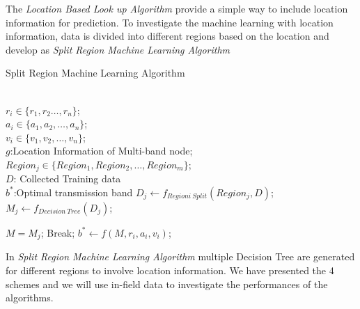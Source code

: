 The \emph{Location Based Look up Algorithm} provide a simple way to include location information for prediction. To investigate the machine learning with location information, data is divided into different regions based on the location and develop as \emph{Split Region Machine Learning Algorithm}


	  \begin{algorithm}
	  \caption{Split Region Machine Learning Algorithm}
	  \label{algorithms: Split}
	  \begin{algorithmic}[1]
	  \REQUIRE  ~~\\
		  $r_i \in \{r_1,r_2 \dots,r_n\}$;\\
		  $a_i \in \{a_1,a_2, \dots, a_n\}$;\\
		  $v_i \in \{v_1,v_2,\dots,v_n\}$;\\
		  $g$:Location Information of Multi-band node;\\
		  $Region_j \in \{Region_1, Region_2,\dots,Region_m\}$;\\
		  $D$: Collected Training data
\ENSURE ~~\\    
		  $b^*$:Optimal transmission band
\STATE $D_{j} \leftarrow f_{Regioni\ Split}(Region_j,D)$;
\STATE $M_{j} \leftarrow f_{Decision\ Tree}(D_{j})$;
\ENDFOR

\STATE $M=M_{j}$;
\STATE Break;
\ENDIF
\ENDFOR
\STATE $b^* \leftarrow f(M,r_i,a_i,v_i)$;
\ENDFOR \\
\end{algorithmic}
\end{algorithm}


In \emph{Split Region Machine Learning Algorithm} multiple Decision Tree are generated for different regions to involve location information. We have presented the 4 schemes and we will use in-field data to investigate the performances of the algorithms.


